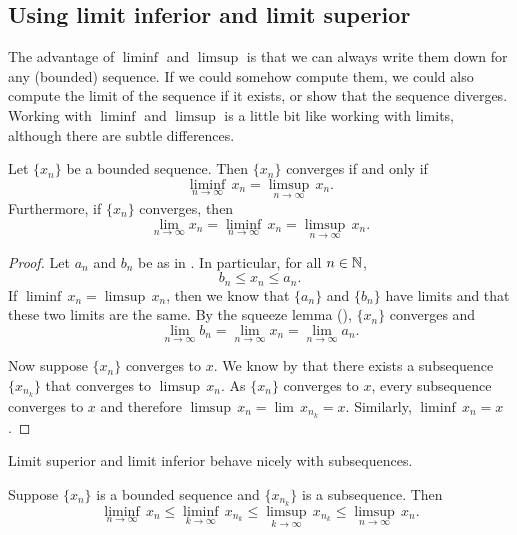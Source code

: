\subsection{Using limit inferior and limit superior}

The advantage of $\liminf$ and $\limsup$ is that we can always write them
down for any (bounded) sequence.
If we could somehow compute them, we could also compute the limit of the
sequence if it exists, or show that the sequence diverges.
Working with $\liminf$ and $\limsup$ is a
little bit like working with limits, although there are subtle differences.

\begin{prop} \label{liminfsupconv:prop}
Let $\{ x_n \}$ be a bounded sequence.  Then $\{ x_n \}$ converges
if and only if
\begin{equation*}
\liminf_{n\to \infty} \, x_n = 
\limsup_{n\to \infty} \, x_n.
\end{equation*}
Furthermore, if $\{ x_n \}$ converges, then
\begin{equation*}
\lim_{n\to \infty} x_n = 
\liminf_{n\to \infty} \, x_n = 
\limsup_{n\to \infty} \, x_n.
\end{equation*}
\end{prop}

\begin{proof}
Let $a_n$ and $b_n$ be as in .
In particular, for all $n \in {\mathbb{N}}$,
\begin{equation*}
b_n \leq x_n \leq a_n .
\end{equation*}
If 
$\liminf \, x_n = \limsup \, x_n$, then we know that $\{ a_n \}$ and $\{ b_n \}$
have limits and that these two limits are the same.  By the squeeze lemma
(), $\{ x_n \}$ converges and
\begin{equation*}
\lim_{n\to \infty} b_n
=
\lim_{n\to \infty} x_n
=
\lim_{n\to \infty} a_n .
\end{equation*}

Now suppose $\{ x_n \}$ converges to $x$.
We know by
that there exists a subsequence $\{ x_{n_k} \}$
that converges to $\limsup \, x_n$.
As $\{ x_n \}$ converges to $x$,
every subsequence converges to $x$ and
therefore $\limsup \, x_n = \lim\, x_{n_k} = x$.  Similarly, $\liminf \, x_n = x$.
\end{proof}

Limit superior and limit inferior behave nicely
with subsequences.

\begin{prop} \label{prop:subseqslimsupinf}
Suppose $\{ x_n \}$ is a bounded sequence and
$\{ x_{n_k} \}$ is a subsequence.  Then
\begin{equation*}
\liminf_{n\to\infty} \, x_n \leq
\liminf_{k\to\infty} \, x_{n_k} \leq
\limsup_{k\to\infty} \, x_{n_k} \leq
\limsup_{n\to\infty} \, x_n .
\end{equation*}
\end{prop}

